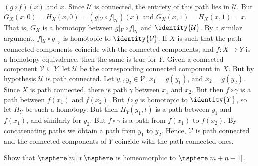\documentclass{article}                                                        %
\begin{document}
\begin{solution}
        $(g\circ{f})(x)$ and $x$. Since $\mathcal{U}$ is connected, the entirety
        of this path lies in $\mathcal{U}$. But
        $G_{X}(x,0)=H_{X}(x,0)=(g|_{\mathcal{V}}\circ{f}|_{\mathcal{U}})(x)$
        and $G_{X}(x,1)=H_{X}(x,1)=x$. That is, $G_{X}$ is a homotopy between
        $g|_{\mathcal{V}}\circ{f}|_{\mathcal{U}}$ and $\identity{\mathcal{U}}$.
        By a similar argument, $f|_{\mathcal{U}}\circ{g}|_{\mathcal{V}}$ is
        homotopic to $\identity{\mathcal{V}}$. If $X$ is such that the path
        connected components coincide with the connected components, and
        $f:X\rightarrow{Y}$ is a homotopy equivalence, then the same is true for
        $Y$. Given a connected component $\mathcal{V}\subseteq{Y}$, let
        $\mathcal{U}$ be the corresponding connected component in $X$. But by
        hypothesis $\mathcal{U}$ is path connected. Let
        $y_{1},y_{2}\in\mathcal{V}$, $x_{1}=g(y_{1})$, and $x_{2}=g(y_{2})$.
        Since $X$ is path connected, there is path $\gamma$ between $x_{1}$ and
        $x_{2}$. But then $f\circ\gamma$ is a path between $f(x_{1})$ and
        $f(x_{2})$. But $f\circ{g}$ is homotopic to $\identity{Y}$, so let
        $H_{Y}$ be such a homotopy. But then $H_{Y}(y_{1},t)$ is a path between
        $y_{1}$ and $f(x_{1})$, and similarly for $y_{2}$. But $f\circ\gamma$
        is a path from $f(x_{1})$ to $f(x_{2})$. By concatenating paths we
        obtain a path from $y_{1}$ to $y_{2}$. Hence, $\mathcal{V}$ is path
        connected and the connected components of $Y$ coincide with the path
        connected ones.
    \end{solution}
    \begin{problem}
        Show that $\nsphere[m]*\nsphere$ is homeomorphic to $\nsphere[m+n+1]$.
    \end{problem}
\end{document}
